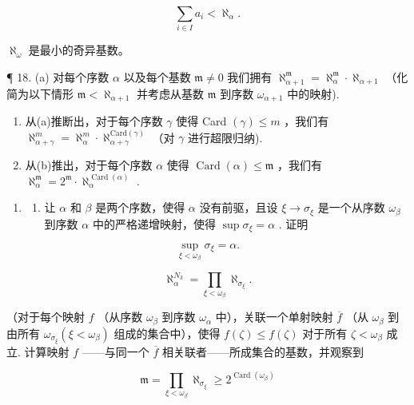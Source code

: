 \[
\sum_ {i \in I} a _ {i} <   \aleph_ {\alpha}.
\]

\(\aleph_{\omega}\) 是最小的奇异基数。

¶ 18. (a) 对每个序数 \(\alpha\) 以及每个基数 \(\mathfrak{m} \neq 0\) 我们拥有 \(\aleph_{\alpha+1}^{\mathfrak{m}} = \aleph_{\alpha}^{\mathfrak{m}} \cdot \aleph_{\alpha+1}\) （化简为以下情形 \(\mathfrak{m} < \aleph_{\alpha+1}\) 并考虑从基数 \(\mathfrak{m}\) 到序数 \(\omega_{\alpha+1}\) 中的映射).

\begin{enumerate}
\def\labelenumi{(\alph{enumi})}
\setcounter{enumi}{1}
\item
  从(a)推断出，对于每个序数 \(\gamma\) 使得 Card \((\gamma) \leqslant m\) ，我们有 \(\aleph_{\alpha + \gamma}^{m} = \aleph_{\alpha}^{m} \cdot \aleph_{\alpha + \gamma}^{\text{Card}(\gamma)}\) （对 \(\gamma\) 进行超限归纳).
\item
  从(b)推出，对于每个序数 \(\alpha\) 使得 \(\operatorname{Card}(\alpha) \leqslant \mathfrak{m}\) ，我们有 \(\aleph_{\alpha}^{\mathfrak{m}} = 2^{\mathfrak{m}} \cdot \aleph_{\alpha}^{\operatorname{Card}(\alpha)}\) .
\end{enumerate}

\begin{enumerate}
\def\labelenumi{\arabic{enumi}.}
\setcounter{enumi}{18}
\tightlist
\item
  \begin{enumerate}
  \def\labelenumii{(\alph{enumii})}
  \tightlist
  \item
    让 \(\alpha\) 和 \(\beta\) 是两个序数，使得 \(\alpha\) 没有前驱，且设 \(\xi \to \sigma_{\xi}\) 是一个从序数 \(\omega_{\beta}\) 到序数 \(\alpha\) 中的严格递增映射，使得 \(\sup \sigma_{\xi} = \alpha\) . 证明
  \end{enumerate}
\end{enumerate}

\[
\sup _ {\xi <   \omega_ {\beta}} \sigma_ {\xi} = \alpha .
\]

\[
\aleph_ {\alpha} ^ {N _ {3}} = \prod_ {\xi <   \omega_ {\beta}} \aleph_ {\sigma_ {\xi}}.
\]

（对于每个映射 \(f\) （从序数 \(\omega_{\beta}\) 到序数 \(\omega_{\alpha}\) 中），关联一个单射映射 \(\overline{f}\) （从 \(\omega_{\beta}\) 到由所有 \(\omega_{\sigma_{\xi}}(\xi < \omega_{\beta})\) 组成的集合中），使得 \(f(\zeta) \leqslant f(\zeta)\) 对于所有 \(\zeta < \omega_{\beta}\) 成立. 计算映射 \(f\) ——与同一个 \(\overline{f}\) 相关联者——所成集合的基数，并观察到

\[
\mathfrak {m} = \prod_ {\xi <   \omega_ {\beta}} \aleph_ {\sigma_ {\xi}} \geqslant 2 ^ {\operatorname{Card} (\omega_ {\beta})}
\]

